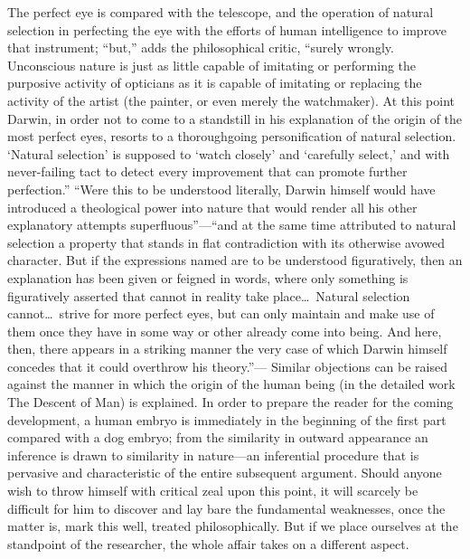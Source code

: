 \documentclass[12pt,a4paper]{article}
\begin{document}
The perfect eye is compared with the telescope, and the operation of
natural selection in perfecting the eye with the efforts of human
intelligence to improve that instrument; ``but,'' adds the
philosophical critic, ``surely wrongly. Unconscious nature is just as
little capable of imitating or performing the purposive activity of
opticians as it
is capable of imitating or replacing the activity of the artist (the
painter, or even merely the watchmaker). At this point Darwin, in
order not to come to a standstill in his explanation of the origin of
the most perfect eyes, resorts to a thoroughgoing personification of
natural selection. `Natural selection' is supposed to `watch closely'
and `carefully select,' and with never-failing tact to detect every
improvement that can promote further perfection.'' ``Were this to be
understood literally, Darwin himself would have introduced a
theological power into nature that would render all his other
explanatory attempts superfluous''---``and at the same time attributed
to natural selection a property that stands in flat contradiction with
its otherwise avowed character. But if the expressions named are to be
understood figuratively, then an explanation has been given or feigned
in words, where only something is figuratively asserted that cannot in
reality take place\ldots\ Natural selection cannot\ldots\ strive for
more perfect eyes, but can only maintain and make use of them once
they have in some way or other already come into being. And here,
then, there appears in a striking manner the very case of which Darwin
himself concedes that it could overthrow his theory.''---
Similar objections can be raised against the manner in which the
origin of the human being (in the detailed work The Descent of
Man) is explained. In order to prepare the reader for the coming
development, a human embryo is immediately in the beginning of the
first part compared with a dog embryo; from the similarity in outward
appearance an inference is drawn to similarity in nature---an
inferential procedure that is pervasive and characteristic of the
entire subsequent argument. Should anyone wish to throw himself with
critical zeal upon this point, it will scarcely be difficult for him
to discover and lay bare the fundamental weaknesses, once the matter
is, mark this well, treated philosophically.
But if we place ourselves at the standpoint of the researcher, the
whole affair takes on a different aspect.
\end{document}

